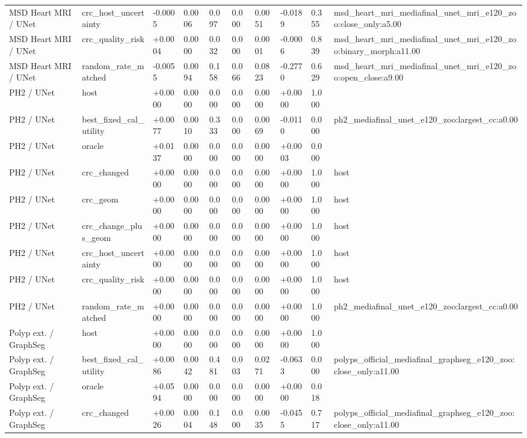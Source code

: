 \begin{table}[t]
\begin{tabular}{llllllllll}
MSD Heart MRI / UNet & crc\_host\_uncertainty & -0.0005 & 0.0006 & 0.097 & 0.000 & 0.0051 & -0.0189 & 0.355 & msd\_heart\_mri\_mediafinal\_unet\_mri\_e120\_zoo:close\_only:a5.00 \\
MSD Heart MRI / UNet & crc\_quality\_risk & +0.0004 & 0.0000 & 0.032 & 0.000 & 0.0001 & -0.0006 & 0.839 & msd\_heart\_mri\_mediafinal\_unet\_mri\_e120\_zoo:binary\_morph:a11.00 \\
MSD Heart MRI / UNet & random\_rate\_matched & -0.0055 & 0.0094 & 0.158 & 0.066 & 0.0823 & -0.2770 & 0.629 & msd\_heart\_mri\_mediafinal\_unet\_mri\_e120\_zoo:open\_close:a9.00 \\
PH2 / UNet & host & +0.0000 & 0.0000 & 0.000 & 0.000 & 0.0000 & +0.0000 & 1.000 &  \\
PH2 / UNet & best\_fixed\_cal\_utility & +0.0077 & 0.0010 & 0.333 & 0.000 & 0.0069 & -0.0110 & 0.000 & ph2\_mediafinal\_unet\_e120\_zoo:largest\_cc:a0.00 \\
PH2 / UNet & oracle & +0.0137 & 0.0000 & 0.000 & 0.000 & 0.0000 & +0.0003 & 0.000 &  \\
PH2 / UNet & crc\_changed & +0.0000 & 0.0000 & 0.000 & 0.000 & 0.0000 & +0.0000 & 1.000 & host \\
PH2 / UNet & crc\_geom & +0.0000 & 0.0000 & 0.000 & 0.000 & 0.0000 & +0.0000 & 1.000 & host \\
PH2 / UNet & crc\_change\_plus\_geom & +0.0000 & 0.0000 & 0.000 & 0.000 & 0.0000 & +0.0000 & 1.000 & host \\
PH2 / UNet & crc\_host\_uncertainty & +0.0000 & 0.0000 & 0.000 & 0.000 & 0.0000 & +0.0000 & 1.000 & host \\
PH2 / UNet & crc\_quality\_risk & +0.0000 & 0.0000 & 0.000 & 0.000 & 0.0000 & +0.0000 & 1.000 & host \\
PH2 / UNet & random\_rate\_matched & +0.0000 & 0.0000 & 0.000 & 0.000 & 0.0000 & +0.0000 & 1.000 & ph2\_mediafinal\_unet\_e120\_zoo:largest\_cc:a0.00 \\
Polyp ext. / GraphSeg & host & +0.0000 & 0.0000 & 0.000 & 0.000 & 0.0000 & +0.0000 & 1.000 &  \\
Polyp ext. / GraphSeg & best\_fixed\_cal\_utility & +0.0086 & 0.0042 & 0.481 & 0.003 & 0.0271 & -0.0633 & 0.000 & polyps\_official\_mediafinal\_graphseg\_e120\_zoo:close\_only:a11.00 \\
Polyp ext. / GraphSeg & oracle & +0.0594 & 0.0000 & 0.000 & 0.000 & 0.0000 & +0.0000 & 0.018 &  \\
Polyp ext. / GraphSeg & crc\_changed & +0.0026 & 0.0004 & 0.148 & 0.000 & 0.0035 & -0.0455 & 0.717 & polyps\_official\_mediafinal\_graphseg\_e120\_zoo:close\_only:a11.00 \\

\end{tabular}
\end{table}
